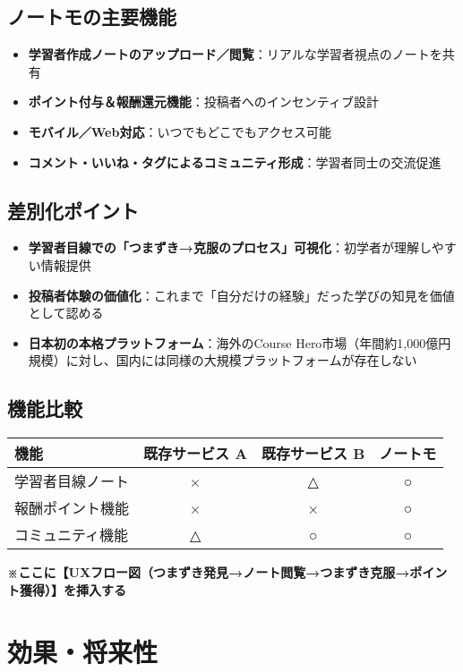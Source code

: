 \documentclass[a4paper,12pt]{jsarticle}
\begin{document}
\subsection{ノートモの主要機能}
\begin{itemize}
\item \textbf{学習者作成ノートのアップロード／閲覧}：リアルな学習者視点のノートを共有
\item \textbf{ポイント付与＆報酬還元機能}：投稿者へのインセンティブ設計
\item \textbf{モバイル／Web対応}：いつでもどこでもアクセス可能
\item \textbf{コメント・いいね・タグによるコミュニティ形成}：学習者同士の交流促進
\end{itemize}

\subsection{差別化ポイント}
\begin{itemize}
\item \textbf{学習者目線での「つまずき→克服のプロセス」可視化}：初学者が理解しやすい情報提供
\item \textbf{投稿者体験の価値化}：これまで「自分だけの経験」だった学びの知見を価値として認める
\item \textbf{日本初の本格プラットフォーム}：海外のCourse Hero市場（年間約1,000億円規模）に対し、国内には同様の大規模プラットフォームが存在しない
\end{itemize}

\subsection{機能比較}
\begin{table}[h]
\centering
\begin{tabular}{|l|c|c|c|}
\hline
機能 & 既存サービス A & 既存サービス B & ノートモ \\
\hline
学習者目線ノート & × & △ & ○ \\
\hline
報酬ポイント機能 & × & × & ○ \\
\hline
コミュニティ機能 & △ & ○ & ○ \\
\hline
\end{tabular}
\end{table}

\textbf{※ここに【UXフロー図（つまずき発見→ノート閲覧→つまずき克服→ポイント獲得）】を挿入する}

\section{効果・将来性}
\end{document}
